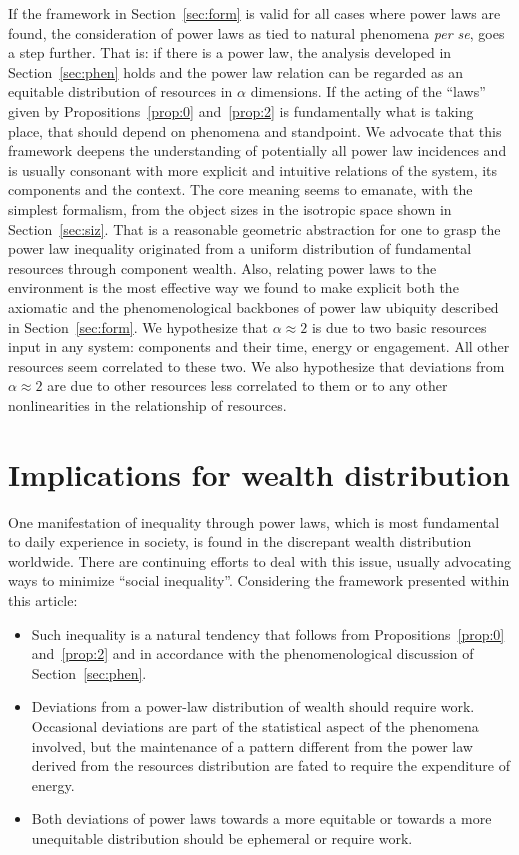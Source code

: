 \documentclass[10pt,letterpaper]{article}
\begin{document}
If the framework in Section~\ref{sec:form} is valid for all cases where power laws are found,
the consideration of power laws as tied to natural phenomena \emph{per se}, goes a step further. 
That is: if there is
a power law, the analysis developed in Section~\ref{sec:phen} holds
and
the power law relation can be regarded as an equitable distribution
of resources in $\alpha$ dimensions.
If the acting of the ``laws'' given by Propositions~\ref{prop:0} and~\ref{prop:2} is fundamentally what is taking place, that should depend on phenomena
and standpoint.
We advocate that this framework deepens the understanding of potentially all power law
incidences and is usually consonant with more explicit and intuitive 
relations of the system, its components and the context.
The core meaning seems to emanate, with the simplest formalism, from
the object sizes in the isotropic space shown in Section~\ref{sec:siz}.
That is a reasonable geometric abstraction for
one to grasp the power law inequality originated from
a uniform distribution
of fundamental resources through component wealth.
Also, relating power laws to the environment is the most effective
way we found to make explicit both the axiomatic
and the phenomenological backbones of power law ubiquity described in
Section~\ref{sec:form}.
We hypothesize that $\alpha \approx 2$ is due to two basic resources
input in any system: components and their time, energy or engagement.
All other resources seem correlated to these two.
We also hypothesize that deviations from $\alpha \approx 2$ are due
to other resources less correlated to them
or to any other nonlinearities in the relationship of resources.

\section{Implications for wealth distribution}\label{sec:esp}

One manifestation of inequality through power laws,
which is most fundamental to daily experience
in society, is found in the discrepant wealth distribution worldwide.
There are continuing efforts to deal with this issue,
usually advocating ways to minimize ``social inequality''.
Considering the framework presented within this article:

\begin{itemize}
	\item Such inequality is a natural tendency that follows from Propositions~\ref{prop:0} and~\ref{prop:2} and in accordance with the phenomenological discussion of Section~\ref{sec:phen}.
	\item Deviations from a power-law distribution of wealth should require work.
		Occasional deviations are part of the statistical aspect of the phenomena involved, but the maintenance of a pattern different from the power law derived from the resources distribution are fated to require the expenditure of energy.
	\item Both deviations of power laws towards a more equitable or towards a more unequitable distribution should be ephemeral or require work.
\end{itemize}
\end{document}
